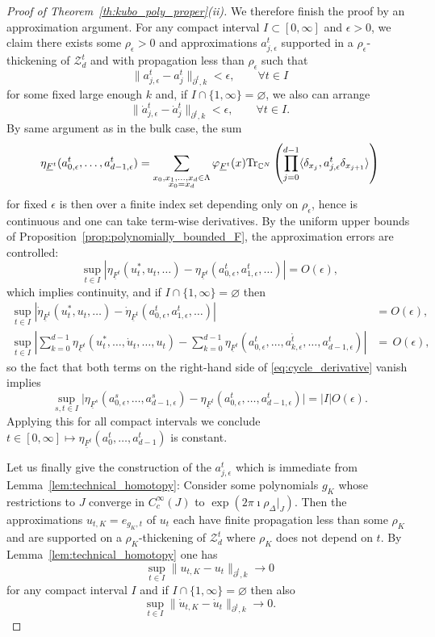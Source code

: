 \documentclass[12pt]{amsart}
\newcommand{\CM}{{\mathbb C}}
\newcommand{\Zz}{{\mathcal Z}}
\newcommand{\Tr}{\mbox{\rm Tr}}
\newcommand{\pdv}{\partial}
\begin{document}
\begin{proof}[Proof of Theorem~\ref{th:kubo_poly_proper}(ii)]
We therefore finish the proof by an approximation argument. 
For any compact interval $I\subset [0,\infty]$ and $\epsilon>0$, we claim there exists some $\rho_\epsilon>0$ and approximations $a_{j, \epsilon}^t$ supported in a $\rho_\epsilon$-thickening of $\Zz_d^t$ and with propagation less than $\rho_\epsilon$ such that 
$$\|a_{j, \epsilon}^t-a_{j}^t\|_{\pdv^t,k}< \epsilon, \qquad \forall t\in I$$
for some fixed large enough $k$ and, if $I\cap \{1,\infty\}=\varnothing$, we also can arrange
$$\|\dot{a}_{j, \epsilon}^t-\dot{a}_{j}^t\|_{\pdv^t,k}< \epsilon, \qquad \forall t\in I.$$
By same argument as in the bulk case, the sum
$$\eta_{\underline{F}^t}(a^t_{0,\epsilon},\dots,a^t_{d-1,\epsilon}) = \sum_{\substack{x_0,x_1,\dots,x_{d} \in \Lambda\\ x_0=x_{d}}}\varphi_{\underline{F}^t}(x)  \Tr_{\CM^N}\left(\prod_{j=0}^{d-1}\langle\delta_{x_j}, a^t_{j,\epsilon}\delta_{x_{j+1}}\rangle\right)$$
for fixed $\epsilon$ is then over a finite index set depending only on $\rho_\epsilon$, hence is continuous and one can take term-wise derivatives. By the uniform upper bounds of Proposition~\ref{prop:polynomially_bounded_F}, the approximation errors are controlled:
$$\sup_{t\in I}|\eta_{\underline{F}^t}(u^*_t,u_t,\dots)-\eta_{\underline{F}^t}(a_{0,\epsilon}^t, a_{1,\epsilon}^t,\dots)|=O(\epsilon),$$
which implies continuity, and if $I\cap \{1,\infty\}= \varnothing$ then
\begin{align*}
\sup_{t\in I}|\dot{ \eta}_{\underline{F}^t}(u^*_t,u_t,\dots)-\dot{ \eta}_{\underline{F}^t}(a_{0,\epsilon}^t, a_{1,\epsilon}^t,\dots)|&=O(\epsilon), \\
\sup_{t\in I}|\sum_{k=0}^{d-1}\eta_{\underline{F}^t}(u^*_t, \dots, \dot{u}_t, \dots, u_t)-\sum_{k=0}^{d-1}\eta_{\underline{F}^t}(a_{0,\epsilon}^t, \dots, \dot{a_{k,\epsilon}^t}, \dots, a_{d-1,\epsilon}^t)|&=\,O(\epsilon),
\end{align*}
so the fact that both terms on the right-hand side of \eqref{eq:cycle_derivative} vanish implies $$\sup_{s,t\in I}\big|\eta_{\underline{F}^s}(a^s_{0,\epsilon},\dots,a^s_{d-1,\epsilon})-\eta_{\underline{F}^t}(a^t_{0,\epsilon},\dots,a^t_{d-1,\epsilon})\big|=|I| O(\epsilon).$$ 
Applying this for all compact intervals we conclude $t\in [0,\infty] \mapsto \eta_{\underline{F}^t}(a^t_{0},\dots,a^t_{d-1})$ is constant.

Let us finally give the construction of the $a^t_{j,\epsilon}$ which is immediate from Lemma~\ref{lem:technical_homotopy}: Consider some polynomials $g_K$ whose restrictions to $J$ converge in $C_c^\infty(J)$ to $\exp(2\pi \imath \rho_\Delta\rvert_J)$. Then the approximations $u_{t,K} = e_{g_K, t}$ of $u_t$ each have finite propagation less than some $\rho_K$ and are supported on a $\rho_K$-thickening of $\Zz_d^t$ where $\rho_K$ does not depend on $t$. By Lemma~\ref{lem:technical_homotopy} one has
$$\sup_{t\in I}\|u_{t,K} -u_{t}\|_{\pdv^t, k} \to 0$$
for any compact interval $I$ and if $I\cap \{1,\infty\}=\varnothing$ then also
$$\sup_{t\in I}\|\dot{u}_{t,K} -\dot{u}_{t}\|_{\pdv^t, k}\to 0.$$




\end{proof}
\end{document}
